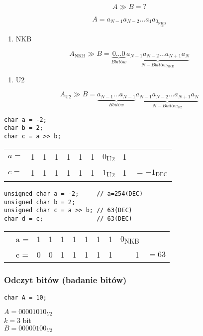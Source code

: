 \documentclass[11pt]{article}
\begin{document}
$$A \gg B = ?$$

$$A= a_{N-1} a_{N-2} \dots a_1 a_0 _{ \underset{ \text{U2}}{\text{NKB}} } $$
\begin{enumerate}
\item NKB
\end{enumerate}
$$A_{\text{NKB}} \gg B = \underbrace{0 \dots 0}_{B \textit{bitów}} \underbrace{a_{N-1} a_{N-2} \dots a_{N+1} a_{N}}_{ {N-B} \textit{bitów}} _\text{NKB} $$

\begin{enumerate}
\item U2
\end{enumerate}
$$A_{\text{U2}} \gg B = \underbrace{a_{N-1} \dots a_{N-1}}_{B \textit{bitów}} \underbrace{a_{N-1} a_{N-2} \dots a_{N+1} a_{N}}_{ {N-B} \textit{bitów}} _\text{U2} $$

\hline

\begin{verbatim}
char a = -2;
char b = 2;
char c = a >> b;
\end{verbatim}
\begin{center}
\begin{tabular}{lrrrrrrlrl}
\(a =\) & 1 & 1 & 1 & 1 & 1 & 1 & 0\textsubscript{U2} & 1 & \\
\(c =\) & 1 & 1 & 1 & 1 & 1 & 1 & 1\textsubscript{U2} & 1 & \(= -1_{\text{DEC}}\)\\
\end{tabular}
\end{center}

\hline
\begin{verbatim}
unsigned char a = -2;     // a=254(DEC)
unsigned char b = 2;
unsigned char c = a >> b; // 63(DEC)
char d = c;               // 63(DEC)
\end{verbatim}

\begin{center}
\begin{tabular}{llrrrrrrrrl}
 & a = & 1 & 1 & 1 & 1 & 1 & 1 & 1 & 0\textsubscript{NKB} & \\
 & c = & 0 & 0 & 1 & 1 & 1 & 1 & 1 & 1 & \(= 63\)\\
\end{tabular}
\end{center}

\subsubsection{Odczyt bitów (badanie bitów)}
\label{sec:orgff816bc}
\begin{verbatim}
char A = 10;
\end{verbatim}
\(A=00001010_{U2}\) \\
\(k=3\) bit \\
\(B=00000100_{U2}\)
\end{document}
